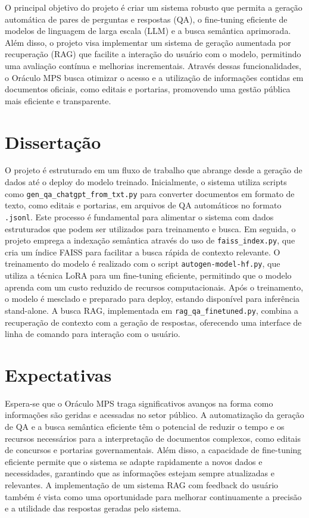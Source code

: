 \documentclass[11pt]{article}
\begin{document}
O principal objetivo do projeto é criar um sistema robusto que permita a geração automática de pares de perguntas e respostas (QA), o fine-tuning eficiente de modelos de linguagem de larga escala (LLM) e a busca semântica aprimorada. Além disso, o projeto visa implementar um sistema de geração aumentada por recuperação (RAG) que facilite a interação do usuário com o modelo, permitindo uma avaliação contínua e melhorias incrementais. Através dessas funcionalidades, o Oráculo MPS busca otimizar o acesso e a utilização de informações contidas em documentos oficiais, como editais e portarias, promovendo uma gestão pública mais eficiente e transparente.

\section{Dissertação}
\label{sec:orgdbe897b}

O projeto é estruturado em um fluxo de trabalho que abrange desde a geração de dados até o deploy do modelo treinado. Inicialmente, o sistema utiliza scripts como \texttt{gen\_qa\_chatgpt\_from\_txt.py} para converter documentos em formato de texto, como editais e portarias, em arquivos de QA automáticos no formato \texttt{.jsonl}. Este processo é fundamental para alimentar o sistema com dados estruturados que podem ser utilizados para treinamento e busca. Em seguida, o projeto emprega a indexação semântica através do uso de \texttt{faiss\_index.py}, que cria um índice FAISS para facilitar a busca rápida de contexto relevante. O treinamento do modelo é realizado com o script \texttt{autogen-model-hf.py}, que utiliza a técnica LoRA para um fine-tuning eficiente, permitindo que o modelo aprenda com um custo reduzido de recursos computacionais. Após o treinamento, o modelo é mesclado e preparado para deploy, estando disponível para inferência stand-alone. A busca RAG, implementada em \texttt{rag\_qa\_finetuned.py}, combina a recuperação de contexto com a geração de respostas, oferecendo uma interface de linha de comando para interação com o usuário.

\section{Expectativas}
\label{sec:org9170a2f}

Espera-se que o Oráculo MPS traga significativos avanços na forma como informações são geridas e acessadas no setor público. A automatização da geração de QA e a busca semântica eficiente têm o potencial de reduzir o tempo e os recursos necessários para a interpretação de documentos complexos, como editais de concursos e portarias governamentais. Além disso, a capacidade de fine-tuning eficiente permite que o sistema se adapte rapidamente a novos dados e necessidades, garantindo que as informações estejam sempre atualizadas e relevantes. A implementação de um sistema RAG com feedback do usuário também é vista como uma oportunidade para melhorar continuamente a precisão e a utilidade das respostas geradas pelo sistema.
\end{document}
